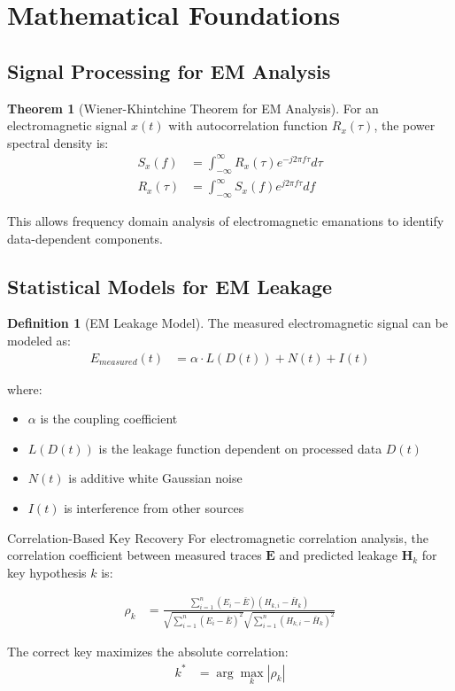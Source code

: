 \documentclass[11pt,a4paper]{article}
\theoremstyle{definition}
\newtheorem{definition}{Definition}[section]
\newtheorem{theorem}{Theorem}[section]
\begin{document}
\section{Mathematical Foundations}

\subsection{Signal Processing for EM Analysis}

\begin{theorem}[Wiener-Khintchine Theorem for EM Analysis]
For an electromagnetic signal $x(t)$ with autocorrelation function $R_x(\tau)$, the power spectral density is:
\begin{align}
S_x(f) &= \int_{-\infty}^{\infty} R_x(\tau) e^{-j2\pi f\tau} d\tau \\
R_x(\tau) &= \int_{-\infty}^{\infty} S_x(f) e^{j2\pi f\tau} df
\end{align}

This allows frequency domain analysis of electromagnetic emanations to identify data-dependent components.
\end{theorem}

\subsection{Statistical Models for EM Leakage}

\begin{definition}[EM Leakage Model]
The measured electromagnetic signal can be modeled as:
\begin{align}
E_{measured}(t) &= \alpha \cdot L(D(t)) + N(t) + I(t)
\end{align}

where:
\begin{itemize}
    \item $\alpha$ is the coupling coefficient
    \item $L(D(t))$ is the leakage function dependent on processed data $D(t)$
    \item $N(t)$ is additive white Gaussian noise
    \item $I(t)$ is interference from other sources
\end{itemize}
\end{definition}

\begin{mathematicsbox}{Correlation-Based Key Recovery}
For electromagnetic correlation analysis, the correlation coefficient between measured traces $\mathbf{E}$ and predicted leakage $\mathbf{H}_k$ for key hypothesis $k$ is:

\begin{align}
\rho_k &= \frac{\sum_{i=1}^n (E_i - \bar{E})(H_{k,i} - \bar{H}_k)}{\sqrt{\sum_{i=1}^n (E_i - \bar{E})^2} \sqrt{\sum_{i=1}^n (H_{k,i} - \bar{H}_k)^2}}
\end{align}

The correct key maximizes the absolute correlation:
\begin{align}
k^* &= \arg\max_k |\rho_k|
\end{align}
\end{mathematicsbox}
\end{document}
